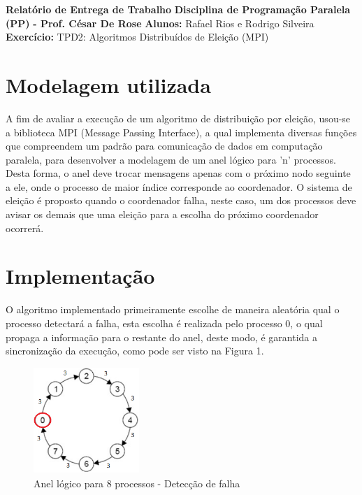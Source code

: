 \documentclass{article}
\begin{document}
\textbf{Relatório de Entrega de Trabalho} \newline
\textbf{Disciplina de Programação Paralela (PP)}\textbf{ - Prof. César De Rose} \newline
\textbf{Alunos:} Rafael Rios e Rodrigo Silveira \newline
\textbf{Exercício:} TPD2: Algoritmos Distribuídos de Eleição (MPI) \newline

\begin{multicols*}{2}

\section{Modelagem utilizada}
A fim de avaliar a execução de um algoritmo de distribuição por eleição, usou-se a biblioteca MPI (Message Passing Interface), a qual implementa diversas funções que compreendem um padrão para comunicação de dados em computação paralela, para desenvolver a modelagem de um anel lógico para 'n' processos. Desta forma, o anel deve trocar mensagens apenas com o próximo nodo seguinte a ele, onde o processo de maior índice corresponde ao coordenador. O sistema de eleição é proposto quando o coordenador falha, neste caso, um dos processos deve avisar os demais que uma eleição para a escolha do próximo coordenador ocorrerá. \newline

\section{Implementação}
O algoritmo implementado primeiramente escolhe de maneira aleatória qual o processo detectará a falha, esta escolha é realizada pelo processo 0, o qual propaga a informação para o restante do anel, deste modo, é garantida a sincronização da execução, como pode ser visto na Figura 1. 

\begin{figure}[H]
            \centering
            \vspace{-0.3em}
            \includegraphics[width=4cm, height=4cm]{anel_falha.png}
            \vspace{-0.6em}
            \caption{Anel lógico para 8 processos - Detecção de falha}
            \vspace{-1.1em}
\end{figure}


\end{multicols*}
\end{document}
